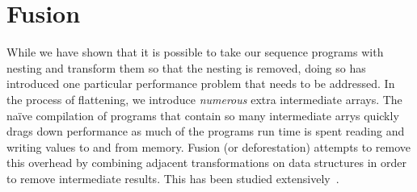 \section{Fusion}
\label{sec:Optimisation}

While we have shown that it is possible to take our sequence programs with nesting and transform them so that the nesting is removed, doing so has introduced one particular performance problem that needs to be addressed. In the process of flattening, we introduce \emph{numerous} extra intermediate arrays. The na\"ive compilation of programs that contain so many intermediate arrys quickly drags down performance as much of the programs run time is spent reading and writing values to and from memory. Fusion
(or deforestation) attempts to remove this overhead
by combining adjacent transformations on data structures in order to remove
intermediate results. This has been studied
extensively~\cite{Wadler:1990ix,Coutts:stream-fusion,Lippmeier:Guiding,McDonell:acc-optim}.






